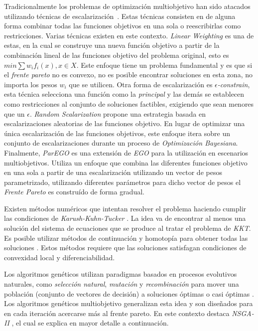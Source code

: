 Tradicionalmente los problemas de optimización multiobjetivo han sido atacados utilizando técnicas de escalarización~\parencite{miettinen2012nonlinear}.
Estas técnicas consisten en de alguna forma combinar todas las funciones objetivos en una sola o reescribirlas como restricciones.
Varias técnicas existen en este contexto. \textit{Linear Weighting} es una de estas, en la cual se construye una nueva función objetivo a partir de la combinación lineal de las funciones objetivo del problema original, esto es $min \sum w_i f_i(x), x \in X$.
Este enfoque tiene un problema fundamental y es que si el \emph{frente pareto} no es convexo, no es posible encontrar soluciones en esta zona, no importa los pesos $w_i$ que se utilicen.
Otra forma de escalarización es \textit{$\epsilon$-constrain}, esta técnica selecciona una función como la \textit{principal} y las demás se establecen como restricciones al conjunto de soluciones factibles, exigiendo que sean menores que un $\epsilon$.
\emph{Random Scalarization} \parencite{paria2020flexible} propone una estrategia basada en escalarizaciones aleatorias de las funciones objetivo.
En lugar de optimizar una única escalarización de las funciones objetivos, este enfoque itera sobre un conjunto de escalarizaciones durante un proceso de \emph{Optimización Bayesiana}.
Finalmente, \emph{ParEGO} \parencite{knowles2006parego} es una extensión de \emph{EGO} \parencite{jones1998ego} para la utilización en escenarios multiobjetivos.
Utiliza un enfoque que combina las diferentes funciones objetivo en una sola a partir de una escalarización utilizando un vector de pesos parametrizado, utilizando diferentes parámetros para dicho vector de pesos el \emph{Frente Pareto} es construído de forma gradual.

Existen métodos numéricos que intentan resolver el problema haciendo cumplir las condiciones de \emph{Karush-Kuhn-Tucker} \parencite{kuhn2014nonlinear}.
La idea va de encontrar al menos una solución del sistema de ecuaciones que se produce al tratar el problema de \textit{KKT}.
Es posible utilizar métodos de continuación y homotopía para obtener todas las soluciones \parencite{hillermeier2001nonlinear, schutze2005continuation}.
Estos métodos requiere que las soluciones satisfagan condiciones de convexidad local y diferenciabilidad.

Los algoritmos genéticos utilizan paradigmas basados en procesos evolutivos naturales, como \textit{selección natural}, \textit{mutación} y \textit{recombinación} para mover una población (conjunto de vectores de decisión) a soluciones óptimas o casi óptimas \parencite{back1996evolutionary}.
Los algoritmos genéticos multiobjetivo generalizan esta idea y son diseñados para en cada iteración acercarse más al frente pareto.
En este contexto destaca \emph{NSGA-II} \parencite{deb2002nsgaii}, el cual se explica en mayor detalle a continuación.

